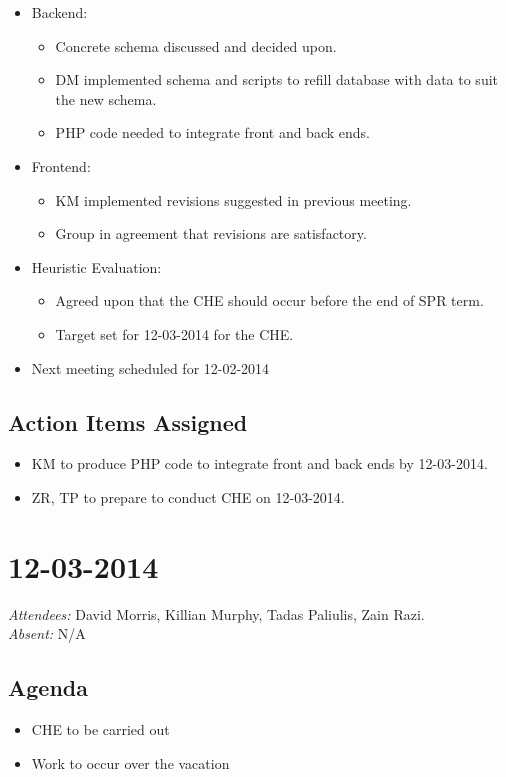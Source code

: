 \documentclass{article}
\begin{document}
\begin{itemize}
\item Backend:
  \begin{itemize}
  \item Concrete schema discussed and decided upon. 
  \item DM implemented schema and scripts to refill database with data to suit the new schema.
  \item PHP code needed to integrate front and back ends.
  \end{itemize}
\item Frontend: 
  \begin{itemize}
  \item KM implemented revisions suggested in previous meeting.
  \item Group in agreement that revisions are satisfactory.
  \end{itemize}
\item Heuristic Evaluation:
  \begin{itemize}
  \item Agreed upon that the CHE should occur before the end of SPR term.
  \item Target set for 12-03-2014 for the CHE.
  \end{itemize}
\item Next meeting scheduled for 12-02-2014
\end{itemize}

\subsection*{Action Items Assigned}
\begin{itemize}
\item KM to produce PHP code to integrate front and back ends by 12-03-2014.
\item ZR, TP to prepare to conduct CHE on 12-03-2014.
\end{itemize}


\clearpage

\section*{12-03-2014}
\vspace{0.5cm}
\emph{Attendees: }David Morris, Killian Murphy, Tadas Paliulis, Zain Razi.
\\
\emph{Absent: }N/A

\subsection*{Agenda}
\begin{itemize}
\item CHE to be carried out
\item Work to occur over the vacation
\end{itemize}
\end{document}
